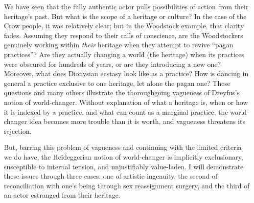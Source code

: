 We have seen that the fully authentic actor pulls possibilities of
action from their heritage's past. But what is the scope of a heritage
or culture? In the case of the Crow people, it was relatively clear; but
in the Woodstock example, that clarity fades. Assuming they respond to
their calls of conscience, are the Woodstockers genuinely working within
\emph{their} heritage when they attempt to revive ``pagan practices''?
Are they actually changing a world (the heritage) when its practices
were obscured for hundreds of years, or are they introducing a new one?
Moreover, what does Dionysian ecstasy look like as a practice? How is
dancing in general a practice exclusive to one heritage, let alone the
pagan one? These questions and many others illustrate the thoroughgoing
vagueness of Dreyfus's notion of world-changer. Without explanation of
what a heritage is, when or how it is indexed by a practice, and what
can count as a marginal practice, the world-changer idea becomes more
trouble than it is worth, and vagueness threatens its rejection.

But, barring this problem of vagueness and continuing with the limited
criteria we do have, the Heideggerian notion of world-changer is
implicitly exclusionary, susceptible to internal tension, and
unjustifiably value-laden. I will demonstrate these issues through three
cases: one of artistic ingenuity, the second of reconciliation with
one's being through sex reassignment surgery, and the third of an actor
estranged from their heritage.

